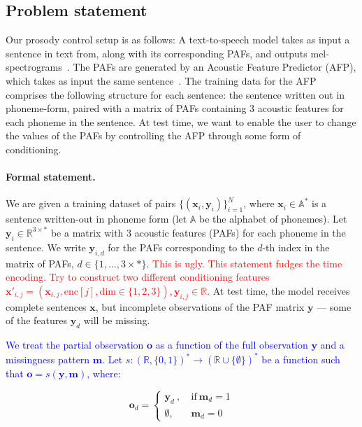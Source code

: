 \documentclass[a4paper,12pt,twoside,openright]{article}
\newcommand{\crit}[1]{\textcolor{red}{#1}}
\newcommand{\draft}[1]{\textcolor{blue}{#1}}
\begin{document}
\subsection{Problem statement}

Our prosody control setup is as follows: A text-to-speech model takes as input a sentence in text from, along with its corresponding PAFs, and outputs mel-spectrograms~\parencite{taylor:2009}. The PAFs are generated by an Acoustic Feature Predictor (AFP), which takes as input the same sentence~\parencite{PaperCup-Ctrl-P:2021}. The training data for the AFP comprises the following structure for each sentence: the sentence written out in phoneme-form, paired with a matrix of PAFs containing 3 acoustic features for each phoneme in the sentence. At test time, we want to enable the user to change the values of the PAFs by controlling the AFP through some form of conditioning.

\paragraph{Formal statement.} We are given a training dataset of pairs $\{(\mathbf{x}_i, \mathbf{y}_i)\}_{i=1}^N$, where $\mathbf{x}_i \in \mathbb{A}^*$ is a sentence written-out in phoneme form (let $\mathbb{A}$ be the alphabet of phonemes). Let $\mathbf{y}_i \in \mathbb{R}^{3 \times *}$ be a matrix with 3 acoustic features (PAFs) for each phoneme in the sentence. We write $\mathbf{y}_{i,d}$ for the PAFs corresponding to the $d$-th index in the matrix of PAFs, $d \in \{1, \dots, 3 \times *\}$. \crit{This is ugly. This statement fudges the time encoding. Try to construct two different conditioning features $\mathbf{x}'_{i,j} = (\mathbf{x}_{i,j}, \mathrm{enc}[j], \mathrm{dim} \in \{1,2,3\}), \mathbf{y}_{i,j} \in \mathbb{R}$.} At test time, the model receives complete sentences $\mathbf{x}$, but incomplete observations of the PAF matrix $\mathbf{y}$ --- some of the features $\mathbf{y}_d$ will be missing.

\draft{We treat the partial observation $\mathbf{o}$ as a function of the full observation $\mathbf{y}$ and a missingness pattern $\mathbf{m}$. Let $s: (\mathbb{R}, \{0, 1\})^* \to (\mathbb{R} \cup \{\emptyset\})^*$ be a function such that $\mathbf{o} = s(\mathbf{y}, \mathbf{m})$, where:}

\[
    \mathbf{o}_{d} = \left\{\begin{array}{ll} \mathbf{y}_{d} ~ , ~ &\text{if} ~ \mathbf{m}_{d} = 1 \\ \emptyset, &\mathbf{m}_d = 0 \end{array}\right.
\]
\end{document}
